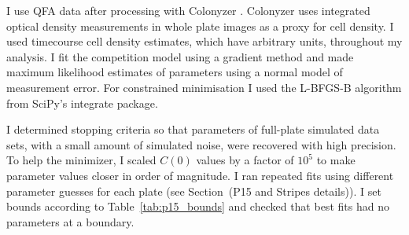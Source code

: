 I use QFA data after processing with Colonyzer \citep{Lawless2010}.
Colonyzer uses integrated optical density measurements in whole plate
images as a proxy for cell density. I used timecourse cell density
estimates, which have arbitrary units, throughout my analysis. I fit
the competition model using a gradient method and made maximum
likelihood estimates of parameters using a normal model of measurement
error. For constrained minimisation I used the L-BFGS-B algorithm from
SciPy's integrate package.

I determined stopping criteria so that parameters of full-plate
simulated data sets, with a small amount of simulated noise, were
recovered with high precision. To help the minimizer, I scaled
\(C(0)\) values by a factor of \(10^{5}\) to make parameter
values closer in order of magnitude. I ran repeated fits using
different parameter guesses for each plate (see Section~(P15 and
Stripes details)). I set bounds according to
Table~\ref{tab:p15_bounds} and checked that best fits had no
parameters at a boundary.
%

